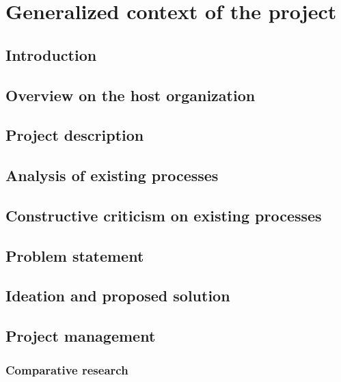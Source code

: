 \graphicspath{{./assets/}}
\setcounter{mtc}{1}
\chapter{Generalized context of the project }
\minitoc
\newpage
\section*{Introduction}


\section{Overview on the host organization  }
\section{Project description}
\section{Analysis of existing processes }

\section{Constructive criticism on existing processes }



\newpage

\section{Problem statement }
\section{Ideation and proposed solution  }
\section{Project management }
\subsection{Comparative research }


